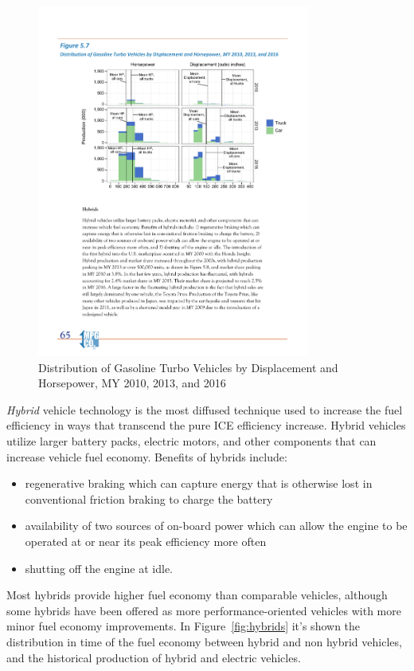 \begin{figure}[ht]
  \centering
  \includegraphics[width=0.8\textwidth]{figures/review/turbodownsizing_distribution.pdf}
  \caption{Distribution of Gasoline Turbo Vehicles by Displacement and Horsepower, MY 2010, 2013, and 2016\label{fig:turbodownsizing_distribution} }
\end{figure}



\emph{Hybrid} vehicle technology is the most diffused technique used to increase the fuel efficiency in ways that transcend the pure ICE efficiency increase. Hybrid vehicles utilize larger battery packs, electric motors, and other components that can  increase vehicle fuel economy. Benefits of hybrids include:
\begin{itemize}
\item regenerative braking which can capture energy that is otherwise lost in conventional friction braking to charge the battery
\item availability of two sources of on-board power which can allow the engine to be operated at or  near its peak efficiency more often
\item shutting off the engine at idle.
\end{itemize} 

Most hybrids provide higher fuel economy than comparable vehicles, although some hybrids have been offered as more performance-oriented vehicles with more minor fuel economy improvements. In Figure~\ref{fig:hybrids} it's shown the distribution in time of the fuel economy between hybrid and non hybrid vehicles, and the historical production of hybrid and electric vehicles.

